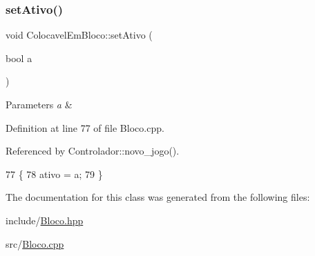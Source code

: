 \subsubsection{\texorpdfstring{set\+Ativo()}{setAtivo()}}
{\footnotesize\ttfamily void Colocavel\+Em\+Bloco\+::set\+Ativo (\begin{DoxyParamCaption}\item[{bool}]{a }\end{DoxyParamCaption})}


\begin{DoxyParams}{Parameters}
{\em a} & \\
\hline
\end{DoxyParams}


Definition at line 77 of file Bloco.\+cpp.



Referenced by Controlador\+::novo\+\_\+jogo().


\begin{DoxyCode}
77                                       \{
78     ativo = a;
79 \}
\end{DoxyCode}


The documentation for this class was generated from the following files\+:\begin{DoxyCompactItemize}
\item 
include/\mbox{\hyperlink{_bloco_8hpp}{Bloco.\+hpp}}\item 
src/\mbox{\hyperlink{_bloco_8cpp}{Bloco.\+cpp}}\end{DoxyCompactItemize}
